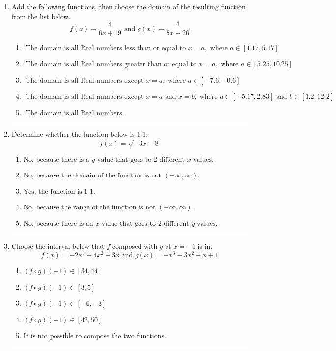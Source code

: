 \documentclass[14pt]{extbook}
\newcommand{\litem}[1]{\item#1\hspace*{-1cm}\rule{\textwidth}{0.4pt}}
\begin{document}
\begin{enumerate}
{\begin{enumerate}[label=\Alph*.]
\end{enumerate} }
\litem{
Add the following functions, then choose the domain of the resulting function from the list below.\[ f(x) = \frac{4}{6x+19} \text{ and } g(x) = \frac{4}{5x-26} \]\begin{enumerate}[label=\Alph*.]
\item \( \text{ The domain is all Real numbers less than or equal to } x = a, \text{ where } a \in [1.17, 5.17] \)
\item \( \text{ The domain is all Real numbers greater than or equal to } x = a, \text{ where } a \in [5.25, 10.25] \)
\item \( \text{ The domain is all Real numbers except } x = a, \text{ where } a \in [-7.6, -0.6] \)
\item \( \text{ The domain is all Real numbers except } x = a \text{ and } x = b, \text{ where } a \in [-5.17, 2.83] \text{ and } b \in [1.2, 12.2] \)
\item \( \text{ The domain is all Real numbers. } \)

\end{enumerate} }
\litem{
Determine whether the function below is 1-1.\[ f(x) = \sqrt{-3 x - 8} \]\begin{enumerate}[label=\Alph*.]
\item \( \text{No, because there is a $y$-value that goes to 2 different $x$-values.} \)
\item \( \text{No, because the domain of the function is not $(-\infty, \infty)$.} \)
\item \( \text{Yes, the function is 1-1.} \)
\item \( \text{No, because the range of the function is not $(-\infty, \infty)$.} \)
\item \( \text{No, because there is an $x$-value that goes to 2 different $y$-values.} \)

\end{enumerate} }
\litem{
Choose the interval below that $f$ composed with $g$ at $x=-1$ is in.\[ f(x) = -2x^{3} -4 x^{2} +3 x \text{ and } g(x) = -x^{3} -3 x^{2} +x + 1 \]\begin{enumerate}[label=\Alph*.]
\item \( (f \circ g)(-1) \in [34, 44] \)
\item \( (f \circ g)(-1) \in [3, 5] \)
\item \( (f \circ g)(-1) \in [-6, -3] \)
\item \( (f \circ g)(-1) \in [42, 50] \)
\item \( \text{It is not possible to compose the two functions.} \)


\end{enumerate}}
\end{enumerate}
\end{document}
